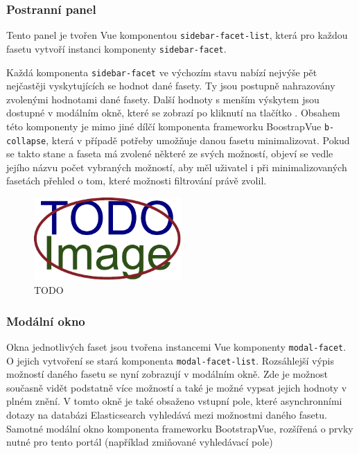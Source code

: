 \subsubsection*{Postranní panel}
Tento panel je tvořen Vue komponentou \texttt{sidebar-facet-list}, která pro každou fasetu vytvoří instanci komponenty \texttt{sidebar-facet}.

Každá komponenta \texttt{sidebar-facet} ve výchozím stavu nabízí nejvýše pět nejčastěji vyskytujících se hodnot dané fasety. Ty jsou postupně nahrazovány zvolenými hodnotami dané fasety. Další hodnoty s menším výskytem jsou dostupné v modálním okně, které se zobrazí po kliknutí na tlačítko . Obsahem této komponenty je mimo jiné dílčí komponenta frameworku BoostrapVue \texttt{b-collapse}, která v případě potřeby umožňuje danou fasetu minimalizovat. Pokud se takto stane a faseta má zvolené některé ze svých možností, objeví se vedle jejího názvu počet vybraných možností, aby měl uživatel i při minimalizovaných fasetách přehled o tom, které možnosti filtrování právě zvolil.

\begin{figure}[H]
	\centering
	\includegraphics[width=0.5\textwidth]{obrazky-figures/placeholder.pdf}
	\caption{TODO}
	\label{mvc}
\end{figure}


\subsubsection*{Modální okno}
Okna jednotlivých faset jsou tvořena instancemi Vue komponenty \texttt{modal-facet}. O jejich vytvoření se stará komponenta \texttt{modal-facet-list}.
Rozsáhlejší výpis možností daného fasetu se nyní zobrazují v modálním okně. Zde je možnost současně vidět podstatně více možností a také je možné vypsat jejich hodnoty v plném znění. V tomto okně je také obsaženo vstupní pole, které asynchronními dotazy na databázi Elasticsearch vyhledává mezi možnostmi daného fasetu. Samotné modální okno komponenta frameworku BootstrapVue, rozšířená o prvky nutné pro tento portál (například zmiňované vyhledávací pole) 

